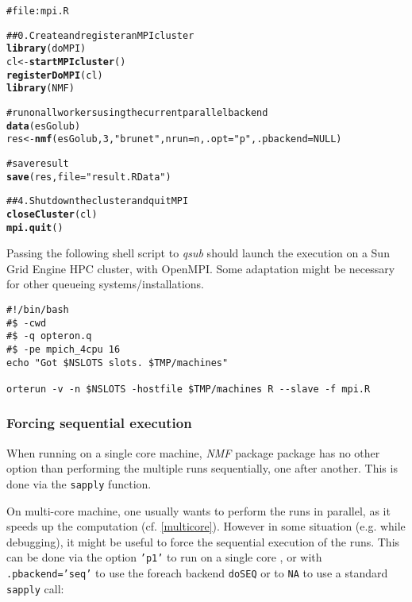 \documentclass[a4paper]{article}\usepackage{graphicx, color}
\makeatletter
\newcommand{\hlfunctioncall}[1]{\textcolor[rgb]{0.501960784313725,0,0.329411764705882}{\textbf{#1}}}%
\newcommand{\hlstring}[1]{\textcolor[rgb]{0.6,0.6,1}{#1}}%
\newcommand{\hlcomment}[1]{\textcolor[rgb]{0.180392156862745,0.6,0.341176470588235}{#1}}%
\newenvironment{kframe}{%
 \def\at@end@of@kframe{}%
 \ifinner\ifhmode%
  \def\at@end@of@kframe{\end{minipage}}%
  \begin{minipage}{\columnwidth}%
 \fi\fi%
 \def\FrameCommand##1{\hskip\@totalleftmargin \hskip-\fboxsep
 \colorbox{shadecolor}{##1}\hskip-\fboxsep
     \hskip-\linewidth \hskip-\@totalleftmargin \hskip\columnwidth}%
 \MakeFramed {\advance\hsize-\width
   \@totalleftmargin\z@ \linewidth\hsize
   \@setminipage}}%
 {\par\unskip\endMakeFramed%
 \at@end@of@kframe}
\newenvironment{knitrout}{}{} %
\let\code=\texttt
\newcommand{\pkgname}[1]{\textit{#1}\xspace}
\newcommand{\Rpkg}[1]{\pkgname{#1} package\xspace}
\newcommand{\nmfpack}{\Rpkg{NMF}}
\makeatother
\begin{document}
\begin{knitrout}
\color{fgcolor}\begin{kframe}
\begin{alltt}
\hlcomment{# file: mpi.R}

\hlcomment{## 0. Create and register an MPI cluster}
\hlfunctioncall{library}(doMPI)
cl <- \hlfunctioncall{startMPIcluster}()
\hlfunctioncall{registerDoMPI}(cl)
\hlfunctioncall{library}(NMF)

\hlcomment{# run on all workers using the current parallel backend}
\hlfunctioncall{data}(esGolub)
res <- \hlfunctioncall{nmf}(esGolub, 3, \hlstring{"brunet"}, nrun = n, .opt = \hlstring{"p"}, .pbackend = NULL)

\hlcomment{# save result}
\hlfunctioncall{save}(res, file = \hlstring{"result.RData"})

\hlcomment{## 4. Shutdown the cluster and quit MPI}
\hlfunctioncall{closeCluster}(cl)
\hlfunctioncall{mpi.quit}()

\end{alltt}
\end{kframe}
\end{knitrout}


Passing the following shell script to \emph{qsub} should launch the execution on a Sun Grid Engine HPC cluster, with OpenMPI.
Some adaptation might be necessary for other queueing systems/installations.

\begin{shaded}
\small
\begin{verbatim}
#!/bin/bash
#$ -cwd 
#$ -q opteron.q
#$ -pe mpich_4cpu 16
echo "Got $NSLOTS slots. $TMP/machines"

orterun -v -n $NSLOTS -hostfile $TMP/machines R --slave -f mpi.R
\end{verbatim}
\end{shaded}

\subsubsection{Forcing sequential execution}
When running on a single core machine, \nmfpack package has no other option than performing the multiple runs sequentially, one after another. 
This is done via the \code{sapply} function.

On multi-core machine, one usually wants to perform the runs in parallel, as it speeds up the computation (cf. \cref{multicore}).
However in some situation (e.g. while debugging), it might be useful to force the sequential execution of the runs. 
This can be done via the option \code{'p1'} to run on a single core , or with
\code{.pbackend='seq'} to use the foreach backend \code{doSEQ} or to \code{NA} to use a standard \code{sapply} call:
\end{document}
